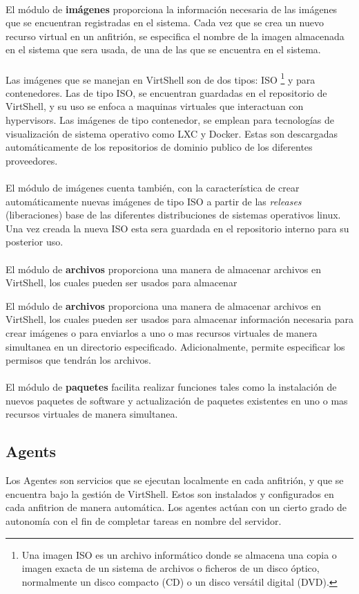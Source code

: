 \\
El módulo de \textbf{imágenes} proporciona la información necesaria de las imágenes que se encuentran registradas en el sistema. Cada vez que se crea un nuevo recurso virtual en un anfitrión, se especifica el nombre de la imagen almacenada en el sistema que sera usada, de una de las que se encuentra en el sistema. \\
\\
Las imágenes que se manejan en VirtShell son de dos tipos: ISO \footnote{Una imagen ISO es un archivo informático donde se almacena una copia o imagen exacta de un sistema de archivos o ficheros de un disco óptico, normalmente un disco compacto (CD) o un disco versátil digital (DVD).} y para contenedores. Las de tipo ISO, se encuentran guardadas en el repositorio de VirtShell, y su uso se enfoca a maquinas virtuales que interactuan con hypervisors. Las imágenes de tipo contenedor, se emplean para tecnologías de visualización de sistema operativo como LXC y Docker. Estas son descargadas automáticamente de los repositorios de dominio publico de los diferentes proveedores. \\
\\
El módulo de imágenes cuenta también, con la característica de crear automáticamente nuevas imágenes de tipo ISO a partir de las \emph{releases} (liberaciones) base de las diferentes distribuciones de sistemas operativos linux. Una vez creada la nueva ISO esta sera guardada en el repositorio interno para su posterior uso.\\
\\
El módulo de \textbf{archivos} proporciona una manera de almacenar archivos en VirtShell, los cuales pueden ser usados para almacenar 

El módulo de \textbf{archivos} proporciona una manera de almacenar archivos en VirtShell, los cuales pueden ser usados para almacenar información necesaria para crear imágenes o para enviarlos a uno o mas recursos virtuales de manera simultanea en un directorio especificado. Adicionalmente, permite especificar los permisos que tendrán los archivos.\\
\\
El módulo de \textbf{paquetes} facilita realizar funciones tales como la instalación de nuevos paquetes de software y actualización de paquetes existentes en uno o mas recursos virtuales de manera simultanea.


\subsection{Agents}
Los Agentes son servicios que se ejecutan localmente en cada anfitrión, y que se encuentra bajo la gestión de VirtShell. Estos son instalados y configurados en cada anfitrion de manera automática. Los agentes actúan con un cierto grado de autonomía con el fin de completar tareas en nombre del servidor.\\
